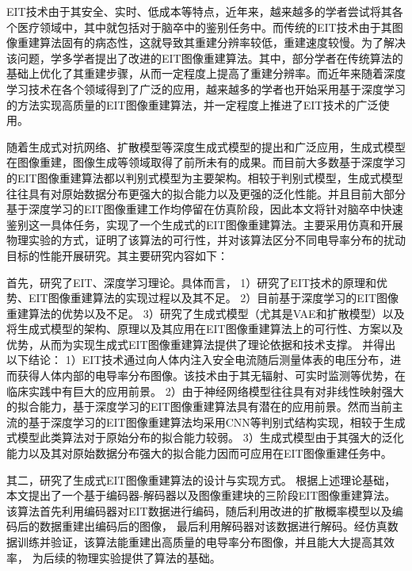 


EIT技术由于其安全、实时、低成本等特点，近年来，越来越多的学者尝试将其各个医疗领域中，其中就包括对于脑卒中的鉴别任务中。而传统的EIT技术由于其图像重建算法固有的病态性，这就导致其重建分辨率较低，重建速度较慢。为了解决该问题，学多学者提出了改进的EIT图像重建算法。其中，部分学者在传统算法的基础上优化了其重建步骤，从而一定程度上提高了重建分辨率。而近年来随着深度学习技术在各个领域得到了广泛的应用，越来越多的学者也开始采用基于深度学习的方法实现高质量的EIT图像重建算法，并一定程度上推进了EIT技术的广泛使用。
 
随着生成式对抗网络、扩散模型等深度生成式模型的提出和广泛应用，生成式模型在图像重建，图像生成等领域取得了前所未有的成果。而目前大多数基于深度学习的EIT图像重建算法都以判别式模型为主要架构。相较于判别式模型，生成式模型往往具有对原始数据分布更强大的拟合能力以及更强的泛化性能。并且目前大部分基于深度学习的EIT图像重建工作均停留在仿真阶段，因此本文将针对脑卒中快速鉴别这一具体任务，实现了一个生成式的EIT图像重建算法。主要采用仿真和开展物理实验的方式，证明了该算法的可行性，并对该算法区分不同电导率分布的扰动目标的性能开展研究。其主要研究内容如下：
 
首先，研究了EIT、深度学习理论。具体而言，
1）研究了EIT技术的原理和优势、EIT图像重建算法的实现过程以及其不足。
2）目前基于深度学习的EIT图像重建算法的优势以及不足。
3）研究了生成式模型（尤其是VAE和扩散模型）以及将生成式模型的架构、原理以及其应用在EIT图像重建算法上的可行性、方案以及优势，从而为实现生成式EIT图像重建算法提供了理论依据和技术支撑。
并得出以下结论：
1）EIT技术通过向人体内注入安全电流随后测量体表的电压分布，进而获得人体内部的电导率分布图像。该技术由于其无辐射、可实时监测等优势，在临床实践中有巨大的应用前景。
2）由于神经网络模型往往具有对非线性映射强大的拟合能力，基于深度学习的EIT图像重建算法具有潜在的应用前景。然而当前主流的基于深度学习的EIT图像重建算法均采用CNN等判别式结构实现，相较于生成式模型此类算法对于原始分布的拟合能力较弱。
3）生成式模型由于其强大的泛化能力以及其对原始数据分布强大的拟合能力因而可应用在EIT图像重建任务中。

其二，研究了生成式EIT图像重建算法的设计与实现方式。
根据上述理论基础，本文提出了一个基于编码器-解码器以及图像重建块的三阶段EIT图像重建算法。
该算法首先利用编码器对EIT数据进行编码，随后利用改进的扩散概率模型以及编码后的数据重建出编码后的图像，
最后利用解码器对该数据进行解码。经仿真数据训练并验证，该算法能重建出高质量的电导率分布图像，并且能大大提高其效率，
为后续的物理实验提供了算法的基础。
 
